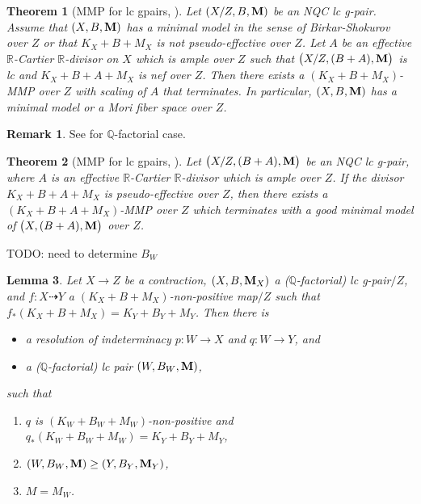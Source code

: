 \documentclass[11pt]{amsart}
\numberwithin{equation}{section}
\newcommand{\Mm}{{\bf{M}}}
\newcommand{\Qq}{\mathbb{Q}}
\newcommand{\Rr}{\mathbb{R}}
\newtheorem{thm}{Theorem}[section]
\newtheorem{lem}[thm]{Lemma}
\theoremstyle{definition}
\theoremstyle{definition}
\theoremstyle{definition}
\newtheorem{remark}[theorem]{Remark}
\begin{document}
\begin{thm}[MMP for lc gpairs, {\cite[Theorem 4.2]{TX23}}]\label{thm: gen pair mmp mfs}
		Let $ (X/Z,B,\Mm) $ be an NQC lc g-pair. Assume that $ (X,B,\Mm) $ has a minimal model in the sense of Birkar-Shokurov over $ Z $ or that $ K_X+B+M_{X} $ is not pseudo-effective over $ Z $. Let $ A $ be an effective $ \Rr $-Cartier $ \Rr $-divisor on $ X $ which is ample over $ Z $ such that $ \big( X/Z, (B+A),\Mm \big) $ is lc and $ K_X + B + A + M_{X} $ is nef over $Z$. Then there exists a $ (K_X + B + M_{X}) $-MMP over $Z$ with scaling of $A$ that terminates. In particular, $ (X,B,\Mm) $ has a minimal model or a Mori fiber space over $ Z $.
\end{thm}
\begin{remark}
  See \cite[Proposition A.3 and Theorem 1.3]{LT22} for $\mathbb{Q}$-factorial case.
\end{remark}

\begin{thm}[MMP for lc gpairs, {\cite[Theorem 4.4]{TX23}}]\label{thm: gen pair mmp}
		Let $ \big( X/Z,(B+A),\Mm \big) $ be an NQC lc g-pair, where $ A $ is an effective $ \mathbb{R} $-Cartier $\mathbb{R}$-divisor which is ample over $ Z $. If the divisor $K_X+B+A+M_{X}$ is pseudo-effective over $Z$, then there exists a $(K_X+B+A+M_{X})$-MMP over $Z$ which terminates with a good minimal model of $ \big( X,(B+A),\Mm \big) $ over $ Z $.
\end{thm}

TODO: need to determine $B_{W}$ 
\begin{lem}\label{lem: higher model and mmp}
Let $X\rightarrow Z$ be a contraction, $(X,B,\Mm_X)$ a ($\Qq$-factorial) lc g-pair$/Z$, and $f: X\dashrightarrow Y$ a $(K_X+B+M_X)$-non-positive map$/Z$ such that $f_*(K_X+B+M_X)=K_Y+B_Y+M_Y$. Then there is 
\begin{itemize}
    \item a resolution of indeterminacy $p: W\rightarrow X$ and $q: W\rightarrow Y$, and
    \item a ($\Qq$-factorial) lc pair $(W,B_W,\Mm)$,
\end{itemize}
such that
\begin{enumerate}
    \item $q$ is $(K_W+B_W+M_W)$-non-positive and $q_*(K_W+B_W+M_W)=K_Y+B_Y+M_Y$,
    \item $(W,B_W,\Mm)\geq (Y,B_Y,\Mm_Y)$,
    \item $M=M_W$.
\end{enumerate} 
\end{lem}
\end{document}
